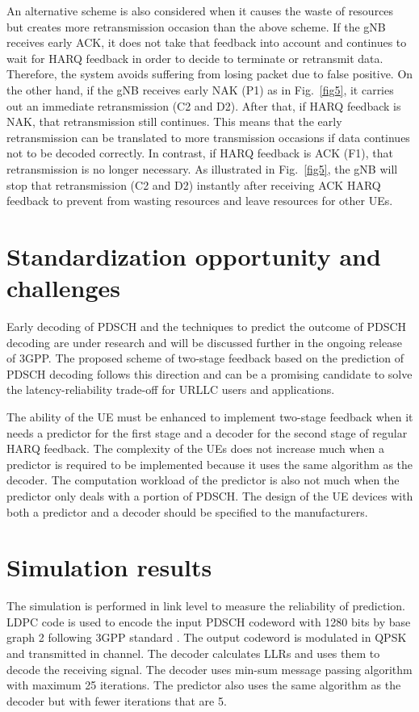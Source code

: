 \documentclass[conference]{IEEEtran}
\begin{document}
An alternative scheme is also considered when it causes the waste of resources but creates more retransmission occasion than the above scheme. If the gNB receives early ACK, it does not take that feedback into account and continues to wait for HARQ feedback in order to decide to terminate or retransmit data. Therefore, the system avoids suffering from losing packet due to false positive. On the other hand, if the gNB receives early NAK (P1) as in Fig.~\ref{fig5}, it carries out an immediate retransmission (C2 and D2). After that, if HARQ feedback is NAK, that retransmission still continues. This means that the early retransmission can be translated to more transmission occasions if data continues not to be decoded correctly. In contrast, if HARQ feedback is ACK (F1), that retransmission is no longer necessary. As illustrated in Fig.~\ref{fig5}, the gNB will stop that retransmission (C2 and D2) instantly after receiving ACK HARQ feedback to prevent from wasting resources and leave resources for other UEs. 

\section{Standardization opportunity and challenges}

Early decoding of PDSCH and the techniques to predict the outcome of PDSCH decoding are under research and will be discussed further in the ongoing release of 3GPP. The proposed scheme of two-stage feedback based on the prediction of PDSCH decoding follows this direction and can be a promising candidate to solve the latency-reliability trade-off for URLLC users and applications.

The ability of the UE must be enhanced to implement two-stage feedback when it needs a predictor for the first stage and a decoder for the second stage of regular HARQ feedback. The complexity of the UEs does not increase much when a predictor is required to be implemented because it uses the same algorithm as the decoder. The computation workload of the predictor is also not much when the predictor only deals with a portion of PDSCH. The design of the UE devices with both a predictor and a decoder should be specified to the manufacturers.  

\section{Simulation results} \label{VV}
The simulation is performed in link level to measure the reliability of prediction. LDPC code is used to encode the input PDSCH codeword with 1280 bits by base graph 2 following 3GPP standard \cite{b8}. The output codeword is modulated in QPSK and transmitted in channel. The decoder calculates LLRs and uses them to decode the receiving signal. The decoder uses min-sum message passing algorithm with maximum 25 iterations. The predictor also uses the same algorithm as the decoder but with fewer iterations that are 5.
\end{document}
